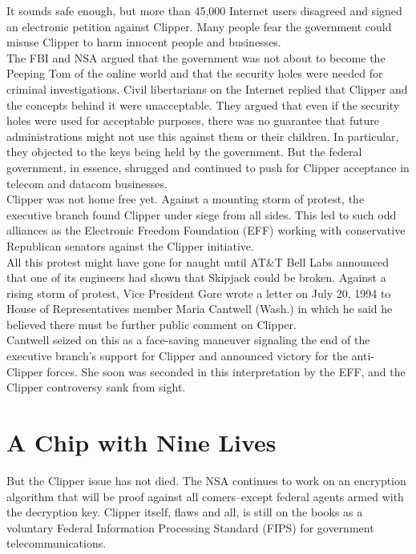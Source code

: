 It sounds safe enough, but more than 45,000 Internet users disagreed and
signed an electronic petition against Clipper. Many people fear the
government could misuse Clipper to harm innocent people and businesses.\\

The FBI and NSA argued that the government was not about to become the
Peeping Tom of the online world and that the security holes were needed
for criminal investigations. Civil libertarians on the Internet replied
that Clipper and the concepts behind it were unacceptable. They argued
that even if the security holes were used for acceptable purposes,
there was no guarantee that future administrations might not use this
against them or their children. In particular, they objected to the
keys being held by the government. But the federal government, in
essence, shrugged and continued to push for Clipper acceptance in
telecom and datacom businesses.\\

Clipper was not home free yet. Against a mounting storm of protest, the
executive branch found Clipper under siege from all sides. This led to
such odd alliances as the Electronic Freedom Foundation (EFF) working
with conservative Republican senators against the Clipper initiative.\\

All this protest might have gone for naught until AT\&T Bell Labs
announced that one of its engineers had shown that Skipjack could be
broken. Against a rising storm of protest, Vice President Gore wrote a
letter on July 20, 1994 to House of Representatives member Maria
Cantwell (Wash.) in which he said he believed there must be further
public comment on Clipper.\\

Cantwell seized on this as a face-saving maneuver signaling the end of
the executive branch's support for Clipper and announced victory for
the anti-Clipper forces. She soon was seconded in this interpretation
by the EFF, and the Clipper controversy sank from sight.

\section{A Chip with Nine Lives}
But the Clipper issue has not died. The NSA continues to work on an
encryption algorithm that will be proof against all comers--except
federal agents armed with the decryption key. Clipper itself, flaws and
all, is still on the books as a voluntary Federal Information
Processing Standard (FIPS) for government telecommunications.\\

